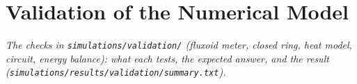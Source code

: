 \chapter{Validation of the Numerical Model}
\label{appendix:validation}

\emph{The checks in \texttt{simulations/validation/} (fluxoid meter, closed ring, heat model, circuit, energy
balance): what each tests, the expected answer, and the result
(\texttt{simulations/results/validation/summary.txt}).}
